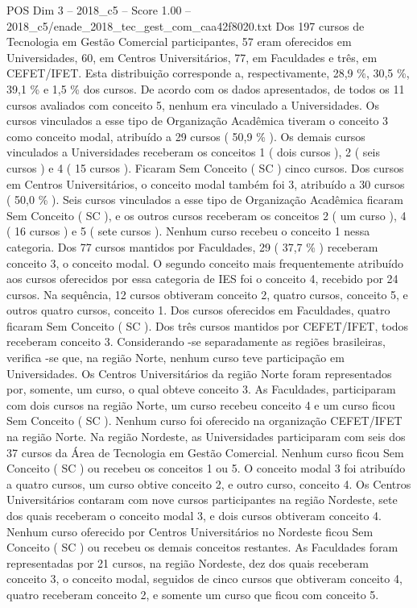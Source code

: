 \begin{textsample}{POS Dim 3 – 2018\_c5 – Score 1.00 – 2018\_c5/enade\_2018\_tec\_gest\_com\_caa42f8020.txt}
Dos 197 cursos de Tecnologia em Gestão Comercial participantes, 57 eram oferecidos em Universidades, 60, em Centros Universitários, 77, em Faculdades e três, em CEFET/IFET.
Esta distribuição corresponde a, respectivamente, 28,9 \%, 30,5 \%, 39,1 \% e 1,5 \% dos cursos.
De acordo com os dados apresentados, de todos os 11 cursos avaliados com conceito 5, nenhum era vinculado a Universidades.
Os cursos vinculados a esse tipo de Organização Acadêmica tiveram o conceito 3 como conceito modal, atribuído a 29 cursos ( 50,9 \% ).
Os demais cursos vinculados a Universidades receberam os conceitos 1 ( dois cursos ), 2 ( seis cursos ) e 4 ( 15 cursos ).
Ficaram Sem Conceito ( SC ) cinco cursos.
Dos cursos em Centros Universitários, o conceito modal também foi 3, atribuído a 30 cursos ( 50,0 \% ).
Seis cursos vinculados a esse tipo de Organização Acadêmica ficaram Sem Conceito ( SC ), e os outros cursos receberam os conceitos 2 ( um curso ), 4 ( 16 cursos ) e 5 ( sete cursos ).
Nenhum curso recebeu o conceito 1 nessa categoria.
Dos 77 cursos mantidos por Faculdades, 29 ( 37,7 \% ) receberam conceito 3, o conceito modal.
O segundo conceito mais frequentemente atribuído aos cursos oferecidos por essa categoria de IES foi o conceito 4, recebido por 24 cursos.
Na sequência, 12 cursos obtiveram conceito 2, quatro cursos, conceito 5, e outros quatro cursos, conceito 1.
Dos cursos oferecidos em Faculdades, quatro ficaram Sem Conceito ( SC ).
Dos três cursos mantidos por CEFET/IFET, todos receberam conceito 3.
Considerando -se separadamente as regiões brasileiras, verifica -se que, na região Norte, nenhum curso teve participação em Universidades.
Os Centros Universitários da região Norte foram representados por, somente, um curso, o qual obteve conceito 3.
As Faculdades, participaram com dois cursos na região Norte, um curso recebeu conceito 4 e um curso ficou Sem Conceito ( SC ).
Nenhum curso foi oferecido na organização CEFET/IFET na região Norte.
Na região Nordeste, as Universidades participaram com seis dos 37 cursos da Área de Tecnologia em Gestão Comercial.
Nenhum curso ficou Sem Conceito ( SC ) ou recebeu os conceitos 1 ou 5.
O conceito modal 3 foi atribuído a quatro cursos, um curso obtive conceito 2, e outro curso, conceito 4.
Os Centros Universitários contaram com nove cursos participantes na região Nordeste, sete dos quais receberam o conceito modal 3, e dois cursos obtiveram conceito 4.
Nenhum curso oferecido por Centros Universitários no Nordeste ficou Sem Conceito ( SC ) ou recebeu os demais conceitos restantes.
As Faculdades foram representadas por 21 cursos, na região Nordeste, dez dos quais receberam conceito 3, o conceito modal, seguidos de cinco cursos que obtiveram conceito 4, quatro receberam conceito 2, e somente um curso que ficou com conceito 5.

\end{textsample}
